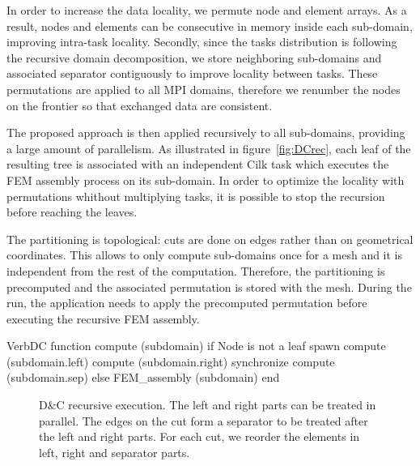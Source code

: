 \documentclass[10pt]{IOS-Book-Article}
\begin{document}
In order to increase the data locality, we permute node and element arrays.
As a result, nodes and elements can be consecutive in memory inside each sub-domain, improving intra-task locality.
Secondly, since the tasks distribution is following the recursive domain decomposition, we store neighboring sub-domains and associated separator contiguously to improve locality between tasks.
These permutations are applied to all MPI domains, therefore we renumber the nodes on the frontier so that exchanged data are consistent.

The proposed approach is then applied recursively to all sub-domains, providing a large amount of parallelism.
As illustrated in figure~\ref{fig:DCrec}, each leaf of the resulting tree is associated with an independent Cilk task which executes the FEM assembly process on its sub-domain.
In order to optimize the locality with permutations whithout multiplying tasks, it is possible to stop the recursion before reaching the leaves.

The partitioning is topological: cuts are done on edges rather than on geometrical coordinates.
This allows to only compute sub-domains once for a mesh and it is independent from the rest of the computation.
Therefore, the partitioning is precomputed and the associated permutation is stored with the mesh.
During the run, the application needs to apply the precomputed permutation before executing the recursive FEM assembly.

\begin{SaveVerbatim}[]{VerbDC}
function compute (subdomain) 
  if Node is not a leaf
    spawn compute (subdomain.left)
    compute (subdomain.right)
    synchronize
    compute (subdomain.sep)
  else
    FEM_assembly (subdomain)
end    
\end{SaveVerbatim}

\begin{figure}[htp]
\caption{D\&C recursive execution. The left and right parts can be treated in parallel. The edges on the cut form a separator to be treated after the left and right parts.
For each cut, we reorder the elements in left, right and separator parts.}
\end{figure}
\end{document}
